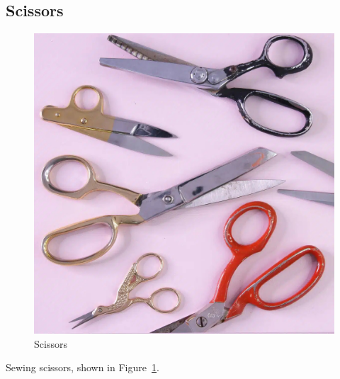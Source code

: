 \documentclass[letterpaper,twoside,12pt]{article}
\begin{document}
\subsection{Scissors}
\begin{figure}[hbpt]\begin{centering}%
\includegraphics[width=5in]{Scissors.jpg}
\caption{Scissors}
\label{fig:scissors}
\end{centering}\end{figure}
Sewing scissors, shown in Figure~\ref{fig:scissors}.
\clearpage
\end{document}
